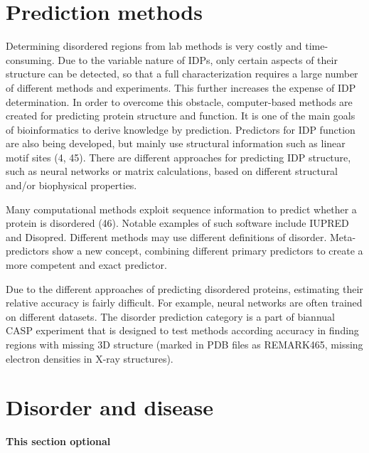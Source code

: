 \documentclass[
]{book}
\begin{document}
\hypertarget{prediction-methods}{%
\section{Prediction methods}\label{prediction-methods}}

Determining disordered regions from lab methods is very costly and time-consuming. Due to the variable nature of IDPs, only certain aspects of their structure can be detected, so that a full characterization requires a large number of different methods and experiments. This further increases the expense of IDP determination. In order to overcome this obstacle, computer-based methods are created for predicting protein structure and function. It is one of the main goals of bioinformatics to derive knowledge by prediction. Predictors for IDP function are also being developed, but mainly use structural information such as linear motif sites (4, 45). There are different approaches for predicting IDP structure, such as neural networks or matrix calculations, based on different structural and/or biophysical properties.

Many computational methods exploit sequence information to predict whether a protein is disordered (46). Notable examples of such software include IUPRED and Disopred. Different methods may use different definitions of disorder. Meta-predictors show a new concept, combining different primary predictors to create a more competent and exact predictor.

Due to the different approaches of predicting disordered proteins, estimating their relative accuracy is fairly difficult. For example, neural networks are often trained on different datasets. The disorder prediction category is a part of biannual CASP experiment that is designed to test methods according accuracy in finding regions with missing 3D structure (marked in PDB files as REMARK465, missing electron densities in X-ray structures).

\hypertarget{disorder-and-disease}{%
\section{Disorder and disease}\label{disorder-and-disease}}

\textbf{This section optional}
\end{document}
